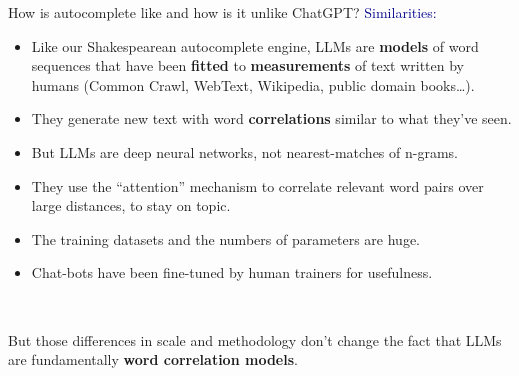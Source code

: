 \documentclass[aspectratio=169]{beamer}
\begin{document}
\begin{frame}{How is autocomplete like and how is it unlike ChatGPT?}
\large
\vspace{0.5 cm}
\textcolor{darkblue}{Similarities:}

\vspace{0.1 cm}
\begin{itemize}
\item Like our Shakespearean autocomplete engine, LLMs are {\bf models} of word sequences that have been {\bf fitted} to {\bf measurements} of text written by humans (Common Crawl, WebText, Wikipedia, public domain books\ldots).
\item<2-> They generate new text with word {\bf correlations} similar to what they've seen.
\end{itemize}

\vspace{0.5 cm}

\vspace{0.1 cm}
\begin{itemize}
\item<3-> But LLMs are deep neural networks, not nearest-matches of n-grams.
\item<4-> They use the ``attention'' mechanism to correlate relevant word pairs over large distances, to stay on topic.
\item<5-> The training datasets and the numbers of parameters are huge.
\item<6-> Chat-bots have been fine-tuned by human trainers for usefulness.
\end{itemize}
\end{frame}

\begin{frame}{\mbox{ }}
\Large
\vspace{0.5 cm}
\begin{center}
But those differences in scale and methodology don't change the fact that LLMs are fundamentally {\bf word correlation models}.

\vspace{1 cm}

\vspace{1 cm}
\end{center}
\end{frame}
\end{document}
